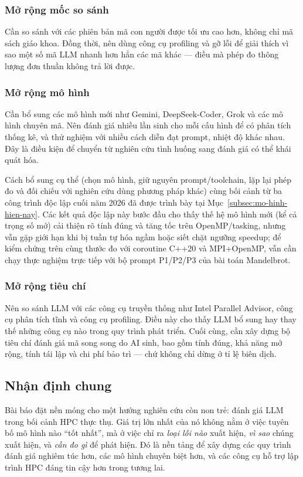 \subsubsection{Mở rộng mốc so sánh}

Cần so sánh với các phiên bản mã con người được tối ưu cao hơn, không chỉ mã sách
giáo khoa. Đồng thời, nên dùng công cụ profiling và gỡ lỗi để giải thích vì sao
một số mã LLM nhanh hơn hẳn các mã khác — điều mà phép đo thông lượng đơn thuần
không trả lời được.

\subsubsection{Mở rộng mô hình}

Cần bổ sung các mô hình mới như Gemini, DeepSeek-Coder, Grok và các mô hình chuyên
mã. Nên đánh giá nhiều lần sinh cho mỗi cấu hình để có phân tích thống kê, và thử
nghiệm với nhiều cách diễn đạt prompt, nhiệt độ khác nhau. Đây là điều kiện để
chuyển từ nghiên cứu tình huống sang đánh giá có thể khái quát hóa.

Cách bổ sung cụ thể (chọn mô hình, giữ nguyên prompt/toolchain, lặp lại phép đo và
đối chiếu với nghiên cứu dùng phương pháp khác) cùng bối cảnh từ ba công trình độc
lập cuối năm 2026 \cite{bantel2026agentic,cui2026hpcbench,nogueira2026openmp} đã
được trình bày tại Mục~\ref{subsec:mo-hinh-hien-nay}. Các kết quả độc lập này bước
đầu cho thấy thế hệ mô hình mới (kể cả trọng số mở) cải thiện rõ tính đúng và tăng
tốc trên OpenMP/tasking, nhưng vẫn gặp giới hạn khi bị tuần tự hóa ngầm hoặc siết
chặt ngưỡng speedup; để kiểm chứng trên cùng thước đo với coroutine C++20 và
MPI+OpenMP, vẫn cần chạy thực nghiệm trực tiếp với bộ prompt P1/P2/P3 của bài toán
Mandelbrot.

\subsubsection{Mở rộng tiêu chí}

Nên so sánh LLM với các công cụ truyền thống như Intel Parallel Advisor, công cụ
phân tích tĩnh và công cụ profiling. Điều này cho thấy LLM bổ sung hay thay thế
những công cụ nào trong quy trình phát triển. Cuối cùng, cần xây dựng bộ tiêu chí
đánh giá mã song song do AI sinh, bao gồm tính đúng, khả năng mở rộng, tính tái
lập và chi phí bảo trì — chứ không chỉ dừng ở tỉ lệ biên dịch.

\subsection{Nhận định chung}

Bài báo đặt nền móng cho một hướng nghiên cứu còn non trẻ: đánh giá LLM trong bối
cảnh HPC thực thụ. Giá trị lớn nhất của nó không nằm ở việc tuyên bố mô hình nào
“tốt nhất”, mà ở việc chỉ ra \emph{loại lỗi nào} xuất hiện, \emph{vì sao} chúng
xuất hiện, và \emph{cần đo gì} để phát hiện. Đó là nền tảng để xây dựng các quy
trình đánh giá nghiêm túc hơn, các mô hình chuyên biệt hơn, và các công cụ hỗ trợ
lập trình HPC đáng tin cậy hơn trong tương lai.
